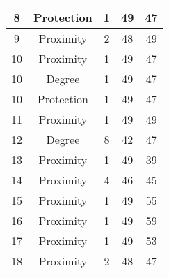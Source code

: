 \documentclass[results.tex]{subfiles}
\begin{document}
\begin{center}
\begin{tabular}{| c || c | c | c | c |}
            \hline
            8                       & Protection                   & 1                      & 49                      & 47                   \\
            \hline
            9                       & Proximity                    & 2                      & 48                      & 49                   \\
            \hline
            10                      & Proximity                    & 1                      & 49                      & 47                   \\
            \hline
            10                      & Degree                       & 1                      & 49                      & 47                   \\
            \hline
            10                      & Protection                   & 1                      & 49                      & 47                   \\
            \hline
            11                      & Proximity                    & 1                      & 49                      & 49                   \\
            \hline
            12                      & Degree                       & 8                      & 42                      & 47                   \\
            \hline
            13                      & Proximity                    & 1                      & 49                      & 39                   \\
            \hline
            14                      & Proximity                    & 4                      & 46                      & 45                   \\
            \hline
            15                      & Proximity                    & 1                      & 49                      & 55                   \\
            \hline
            16                      & Proximity                    & 1                      & 49                      & 59                   \\
            \hline
            17                      & Proximity                    & 1                      & 49                      & 53                   \\
            \hline
            18                      & Proximity                    & 2                      & 48                      & 47                   \\

\end{tabular}
\end{center}
\end{document}
